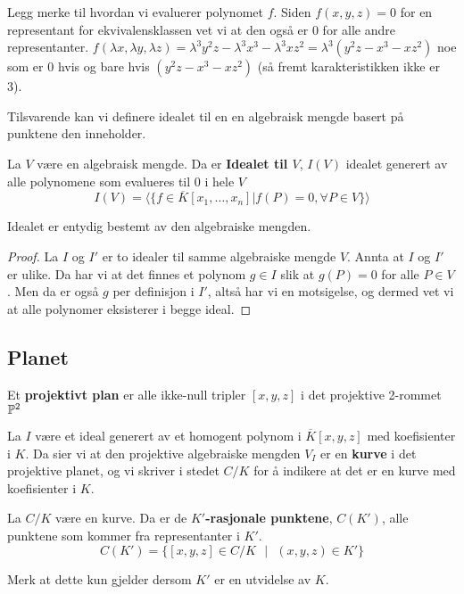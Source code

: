 Legg merke til hvordan vi evaluerer polynomet $f$. Siden $f(x,y,z) = 0$ for en representant for ekvivalensklassen vet vi at den også er $0$ for alle andre representanter. $f(\lambda x, \lambda y, \lambda z) = \lambda^3 y^2z - \lambda^3 x^3 - \lambda^3 xz^2 = \lambda^3 ( y^2z - x^3 - xz^2)$ noe som er $0$ hvis og bare hvis $(y^2z - x^3 - xz^2)$ (så fremt karakteristikken ikke er 3).

Tilsvarende kan vi definere idealet til en en algebraisk mengde basert på punktene den inneholder. 
\begin{definisjon}
    La $V$ være en algebraisk mengde. Da er \textbf{Idealet til $V$}, $I(V)$ idealet generert av alle polynomene som evalueres til $0$ i hele $V$ $$I(V) = \langle \{f \in \overline{K}[x_1, \ldots, x_n] | f(P) = 0, \forall P \in V \} \rangle$$
\end{definisjon}
\begin{proposisjon}
Idealet er entydig bestemt av den algebraiske mengden.
\begin{proof}
La $I$ og $I'$ er to idealer til samme algebraiske mengde $V$. Annta at $I$ og $I'$ er ulike. Da har vi at det finnes et polynom $g \in I$ slik at $g(P) = 0$ for alle $P \in V$. Men da er også $g$ per definisjon i $I'$, altså har vi en motsigelse, og dermed vet vi at alle polynomer eksisterer i begge ideal.
\end{proof}
\end{proposisjon}

\subsection{Planet}
\begin{definisjon}
Et \textbf{projektivt plan} er alle ikke-null tripler $[x, y, z]$ i det projektive 2-rommet $\mathbb{P}^2$
\end{definisjon}

\begin{definisjon}
La $I$ være et ideal generert av et homogent polynom i $\overline{K}[x,y,z]$ med koefisienter i $K$. Da sier vi at den projektive algebraiske mengden $V_I$ er en \textbf{kurve} i det projektive planet, og vi skriver i stedet $C/K$ for å indikere at det er en kurve med koefisienter i $K$. 
\end{definisjon}

\begin{definisjon}
La $C/K$ være en kurve. Da er de \textbf{$K'$-rasjonale punktene}, $C(K')$, alle punktene som kommer fra representanter i $K'$. 
$$ C(K') = \{[x, y, z] \in C/K \text{ $|$ } (x,y,z) \in K'\}$$

Merk at dette kun gjelder dersom $K'$ er en utvidelse av $K$.
\end{definisjon}


